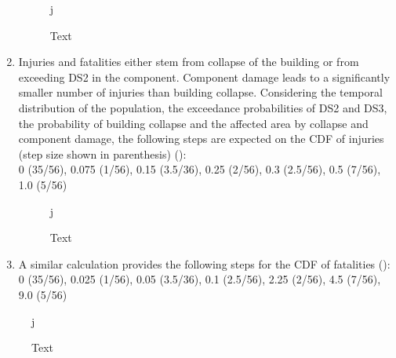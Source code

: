 \begin{enumerate}
\begin{figure}[!htbp]j
  \caption{Text}
  \label{fig:ver_1_10}
\end{figure}

    \item Injuries and fatalities either stem from collapse of the building or from exceeding DS2 in the component. Component damage leads to a significantly smaller number of injuries than building collapse. Considering the temporal distribution of the population, the exceedance probabilities of DS2 and DS3, the probability of building collapse and the affected area by collapse and component damage, the following steps are expected on the CDF of injuries (step size shown in parenthesis) ():\\
    0 (35/56), 0.075 (1/56), 0.15 (3.5/36), 0.25 (2/56), 0.3 (2.5/56), 0.5 (7/56), 1.0 (5/56)
    
\begin{figure}[!htbp]j
  \caption{Text}
  \label{fig:ver_1_11}
\end{figure}

    \item A similar calculation provides the following steps for the CDF of fatalities ():\\
    0 (35/56), 0.025 (1/56), 0.05 (3.5/36), 0.1 (2.5/56), 2.25 (2/56), 4.5 (7/56), 9.0 (5/56)
\end{enumerate}

\begin{figure}[!htbp]j
  \caption{Text}
  \label{fig:ver_1_12}
\end{figure}